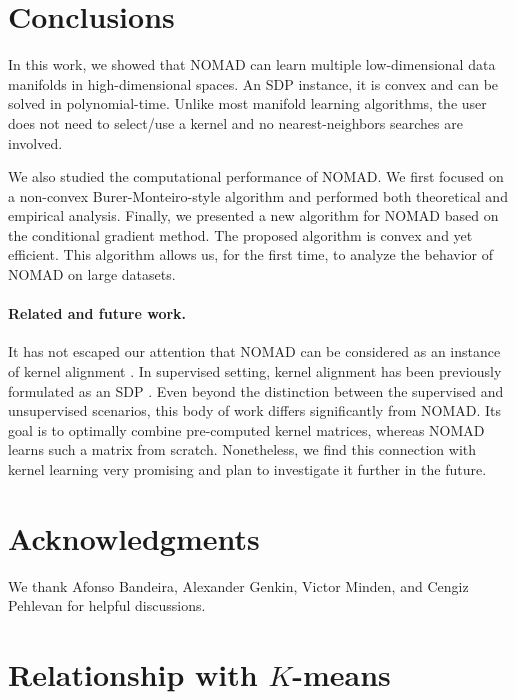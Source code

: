 \documentclass[twoside,11pt]{article}
\begin{document}
\section{Conclusions}
\label{sec:conclusions}

In this work, we showed that NOMAD can learn multiple low-dimensional data manifolds in high-dimensional spaces. An SDP instance, it is convex and can be solved in polynomial-time. Unlike most manifold learning algorithms, the user does not need to select/use a kernel and no nearest-neighbors searches are involved.

We also studied the computational performance of NOMAD.
We first focused on a non-convex Burer-Monteiro-style algorithm and performed both theoretical and empirical analysis.
Finally, we presented a new algorithm for NOMAD based on the conditional gradient method. The proposed algorithm is convex and yet efficient. This algorithm allows us, for the first time, to analyze the behavior of NOMAD on large datasets.

\paragraph{Related and future work.}
It has not escaped our attention that NOMAD can be considered as an instance of kernel alignment \citep{Cristianini2002}.
In supervised setting, kernel alignment has been previously formulated as an SDP 
\citep[e.g.,][]{Lanckriet2004,Cortes2012_centeredalignment}. Even beyond the distinction between the supervised and unsupervised scenarios, this body of work differs significantly from NOMAD. Its goal is to optimally combine pre-computed kernel matrices, whereas NOMAD learns such a matrix from scratch.
Nonetheless, we find this connection with kernel learning very promising and plan to investigate it further in the future.

\section*{Acknowledgments}
We thank Afonso Bandeira, Alexander Genkin, Victor Minden, and Cengiz Pehlevan for helpful discussions.

\newpage


\appendix

\section{Relationship with $K$-means}
\label{sec:kmeans}
\end{document}

